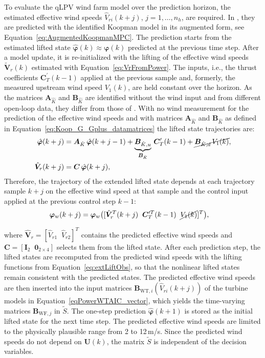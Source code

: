 To evaluate the qLPV wind farm model over the prediction horizon, the estimated effective wind speeds $\hat{V}_{ri}(k+j)$, $j = 1, \dots, n_h$, are required. In \cite{dittmer2022data}, they are predicted with the identified Koopman model in its augmented form, see Equation~\eqref{eq:AugmentedKoopmanMPC}. 
The prediction starts from the estimated lifted state $\hat{\bm{\varphi}}(k)\approx \bm{\varphi}(k)$ predicted at the previous time step. After a model update, it is re-initialized with the lifting of the effective wind speeds $\tilde{\bm{V}}_r(k)$ estimated with Equation~\eqref{eq:VrFromPower}. The inputs, i.e., the thrust coefficients $\bm{C}_T^\prime(k-1)$ applied at the previous sample and, formerly, the measured upstream wind speed $V_1(k)$, are held constant over the horizon. As the matrices $\bm{A}_{\hat{K}}$ and $\bm{B}_{\hat{K}}$ are identified without the wind input and from different open-loop data, they differ from those of \cite{dittmer2022data}. With no wind measurement for the prediction of the effective wind speeds and with matrices $\bm{A}_{\hat{K}}$ and $\bm{B}_{\hat{K}}$ as defined in Equation~\eqref{eq:Koop_G_Gplus_datamatrices} the lifted state trajectories are:
\begin{align*}
    \hat{\bm{\varphi}}(k+j) &= \bm{A}_{\hat{K}}\, \hat{\bm{\varphi}}(k+j-1) + \underbrace{\bm{B}_{\hat{K},u}}_{\bm{B}_{\hat{K}}}\, \bm{C}_T^\prime(k-1) + \cancel{\bm{B}_{\hat{K},d}\, V_1(k)}, \\
    \hat{\bm{V}}_r(k+j) &= \bm{C}\, \hat{\bm{\varphi}}(k+j),\end{align*}
Therefore, the trajectory of the extended lifted state depends at each trajectory sample $k+j$ on the effective wind speed at that sample and the control input applied at the previous control step $k-1$:
\begin{align*}    
    \bm{\varphi}_w(k+j) &= \bm{\varphi}_w\big([\hat{\bm{V}}_r^T(k+j) \;\; \bm{C}_T^{\prime T}(k-1) \;\; \cancel{V_1(k)}]^T\big),
\end{align*}

where $\hat{\bm{V}}_r = [\hat{V}_{r1} \;\; \hat{V}_{r2}]^T$ contains the predicted effective wind speeds and $\bm{C} = [\bm{I}_{2} \;\; \bm{0}_{2 \times 4}]$ selects them from the lifted state.   After each prediction step, the lifted states are recomputed from the predicted wind speeds with the lifting functions from Equation~\eqref{eq:extLiftObs}, so that the nonlinear lifted states remain consistent with the predicted states. The predicted effective wind speeds are then inserted into the input matrices $\bm{B}_{\text{WT},i}(\hat{V}_{ri}(k+j))$ of the turbine models in Equation~\eqref{eqPowerWTAIC_vector}, which yields the time-varying matrices $\bm{B}_{\text{WF},j}$ in $\tilde{S}$. The one-step prediction $\hat{\bm{\varphi}}(k+1)$ is stored as the initial lifted state for the next time step. The predicted effective wind speeds are limited to the physically plausible range from 2 to 12\,m/s. Since the predicted wind speeds do not depend on $\bm{U}(k)$, the matrix $\tilde{S}$ is independent of the decision variables.

